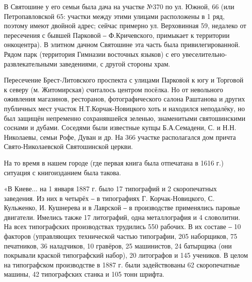 \vspace{0.5cm}

В Святошине у его семьи была дача на участке №370 по ул. Южной, 66 (или
Петропавловской 65: участки между этими улицами расположены в 1 ряд, поэтому
имеют двойной адрес; сейчас примерно ул. Верховинная 59, недалеко от
пересечения с бывшей Парковой ‒ Ф.Кричевского, примыкает к территории
онкоцентра). В элитном дачном Святошине эта часть была привилегированной. Рядом
парк (территория Гимназии восточных языков) с его
увеселительно-развлекательными заведениями, с другой стороны храм. 

\vspace{0.5cm}

Пересечение
Брест-Литовского проспекта с улицами Парковой к югу и Торговой  к северу (м.
Житомирская) считалось центром посёлка. Но от невольного оживления магазинов,
ресторанов, фотографического салона Раштанова и других публичных мест участок
Н.Т.Корчак-Новицкого хоть и находился неподалёку, но был защищён непременно
сохранявшейся зеленью, знаменитыми святошинскими соснами и дубами. Соседями
были известные купцы Б.А.Семадени, С. и Н.Н. Николаевы, семьи Рофе, Дуван и др.
На 366 участке располагался дом причта Свято-Николаевской Святошинской церкви. 

\vspace{0.5cm}

На то время в нашем городе (где первая книга была отпечатана в 1616 г.)
ситуация с книгоизданием была такова.  

\raggedcolumns
\begin{multicols}{2} %
\setlength{\parindent}{0pt}


\end{multicols} %

«В Киеве... на 1 января 1887 г. было 17 типографий  и 2 скоропечатных заведения.
Из них в четырёх ‒ в типографиях Г. Корчак-Новицкого, С. Кульженко, И. Кушнерева
и в Лаврской ‒ в производстве применялись паровые двигатели. Имелись также 17
литографий, одна металлография и 4 словолитни. На всех типографских
производствах трудились 550 рабочих. В их составе ‒ 10 факторов (управляющих
технической частью типографии, 205 наборщиков, 75 печатников, 36 наладчиков,
10 гравёров, 25 машинистов, 24 батырщика (они покрывали краской типографский
набор), 20 литографов и 145 учеников. В целом на типографском производстве в
1887 г. были задействованы 62 скоропечатные машины, 42 типографских станка и
105 тонн шрифта.

